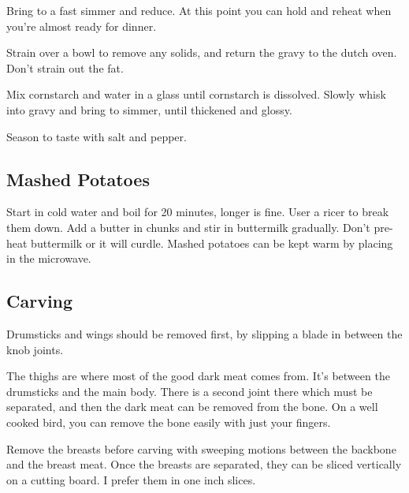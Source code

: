 \begin{recipe}
Bring to a fast simmer and reduce. At this point you can hold and reheat when you're almost ready for dinner.

Strain over a bowl to remove any solids, and return the gravy to the dutch oven. Don't strain out the fat. 


Mix cornstarch and water in a glass until cornstarch is dissolved. Slowly whisk into gravy and bring to simmer, until thickened and glossy. 

Season to taste with salt and pepper.

\subsection{Mashed Potatoes}



Start in cold water and boil for 20 minutes, longer is fine. User a ricer to break them down. Add a butter in chunks and stir in buttermilk gradually. Don't pre-heat buttermilk or it will curdle. Mashed potatoes can be kept warm by placing in the microwave. 

\newpage
\subsection{Carving}

Drumsticks and wings should be removed first, by slipping a blade in between the knob joints.

The thighs are where most of the good dark meat comes from. It's between the drumsticks and the main body. There is a second joint there which must be separated, and then the dark meat can be removed from the bone. On a well cooked bird, you can remove the bone easily with just your fingers.

Remove the breasts before carving with sweeping motions between the backbone and the breast meat.
Once the breasts are separated, they can be sliced vertically on a cutting board.
I prefer them in one inch slices.

\end{recipe}
